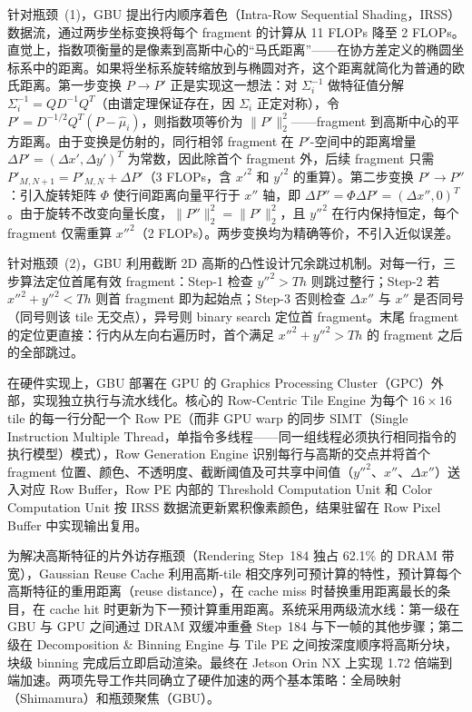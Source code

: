 针对瓶颈~(1)，GBU 提出行内顺序着色（Intra-Row Sequential Shading，IRSS）数据流，通过两步坐标变换将每个 fragment 的计算从 11 FLOPs 降至 2 FLOPs。直觉上，指数项衡量的是像素到高斯中心的“马氏距离”——在协方差定义的椭圆坐标系中的距离。如果将坐标系旋转缩放到与椭圆对齐，这个距离就简化为普通的欧氏距离。第一步变换 $P\to P'$ 正是实现这一想法：对 $\Sigma_i^{-1}$ 做特征值分解 $\Sigma_i^{-1}=QD^{-1}Q^T$（由谱定理保证存在，因 $\Sigma_i$ 正定对称），令 $P'=D^{-1/2}Q^T(P-\hat{\mu}_i)$，则指数项等价为 $\|P'\|_2^2$——fragment 到高斯中心的平方距离。由于变换是仿射的，同行相邻 fragment 在 $P'$-空间中的距离增量 $\Delta P'=(\Delta x', \Delta y')^T$ 为常数，因此除首个 fragment 外，后续 fragment 只需 $P'_{M,N+1}=P'_{M,N}+\Delta P'$（3 FLOPs，含 $x'^2$ 和 $y'^2$ 的重算）。第二步变换 $P'\to P''$：引入旋转矩阵 $\Phi$ 使行间距离向量平行于 $x''$ 轴，即 $\Delta P''=\Phi\Delta P'=(\Delta x'', 0)^T$。由于旋转不改变向量长度，$\|P''\|_2^2=\|P'\|_2^2$，且 $y''^2$ 在行内保持恒定，每个 fragment 仅需重算 $x''^2$（2 FLOPs）。两步变换均为精确等价，不引入近似误差。

针对瓶颈~(2)，GBU 利用截断 2D 高斯的凸性设计冗余跳过机制。对每一行，三步算法定位首尾有效 fragment：Step-1 检查 $y''^2 > Th$ 则跳过整行；Step-2 若 $x''^2+y''^2 < Th$ 则首 fragment 即为起始点；Step-3 否则检查 $\Delta x''$ 与 $x''$ 是否同号（同号则该 tile 无交点），异号则 binary search 定位首 fragment。末尾 fragment 的定位更直接：行内从左向右遍历时，首个满足 $x''^2+y''^2 > Th$ 的 fragment 之后的全部跳过。

在硬件实现上，GBU 部署在 GPU 的 Graphics Processing Cluster（GPC）外部，实现独立执行与流水线化。核心的 Row-Centric Tile Engine 为每个 $16\times 16$ tile 的每一行分配一个 Row PE（而非 GPU warp 的同步 SIMT（Single Instruction Multiple Thread，单指令多线程——同一组线程必须执行相同指令的执行模型）模式），Row Generation Engine 识别每行与高斯的交点并将首个 fragment 位置、颜色、不透明度、截断阈值及可共享中间值（$y''^2$、$x''$、$\Delta x''$）送入对应 Row Buffer，Row PE 内部的 Threshold Computation Unit 和 Color Computation Unit 按 IRSS 数据流更新累积像素颜色，结果驻留在 Row Pixel Buffer 中实现输出复用。

为解决高斯特征的片外访存瓶颈（Rendering Step~184 独占 62.1\% 的 DRAM 带宽），Gaussian Reuse Cache 利用高斯-tile 相交序列可预计算的特性，预计算每个高斯特征的重用距离（reuse distance），在 cache miss 时替换重用距离最长的条目，在 cache hit 时更新为下一预计算重用距离。系统采用两级流水线：第一级在 GBU 与 GPU 之间通过 DRAM 双缓冲重叠 Step~184 与下一帧的其他步骤；第二级在 Decomposition \& Binning Engine 与 Tile PE 之间按深度顺序将高斯分块，块级 binning 完成后立即启动渲染。最终在 Jetson Orin NX 上实现 1.72 倍端到端加速。两项先导工作共同确立了硬件加速的两个基本策略：全局映射（Shimamura）和瓶颈聚焦（GBU）。

